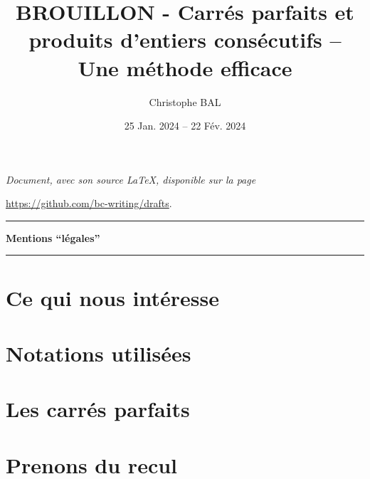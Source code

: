 \documentclass[12pt]{amsart}
\newcommand\contentdir{\jobname}
\begin{document}
\title{BROUILLON - Carrés parfaits et produits d'entiers consécutifs -- Une méthode efficace}
\author{Christophe BAL}
\date{25 Jan. 2024 -- 22 Fév. 2024}

\maketitle

\begin{center}
	\itshape
	Document, avec son source \LaTeX, disponible sur la page
	
	\url{https://github.com/bc-writing/drafts}.
\end{center}


\bigskip


\begin{center}
	\hrule\vspace{.3em}
	{
		\fontsize{1.35em}{1em}\selectfont
		\textbf{Mentions \enquote{légales}}
	}
			
	\vspace{0.45em}
	\small
	\doclicenseThis
	\hrule
\end{center}


\setcounter{tocdepth}{2}
\tableofcontents




\newpage
\section{Ce qui nous intéresse}






\bigskip
\section{Notations utilisées}






\newpage
\section{Les carrés parfaits}







\section{Prenons du recul}
\end{document}
